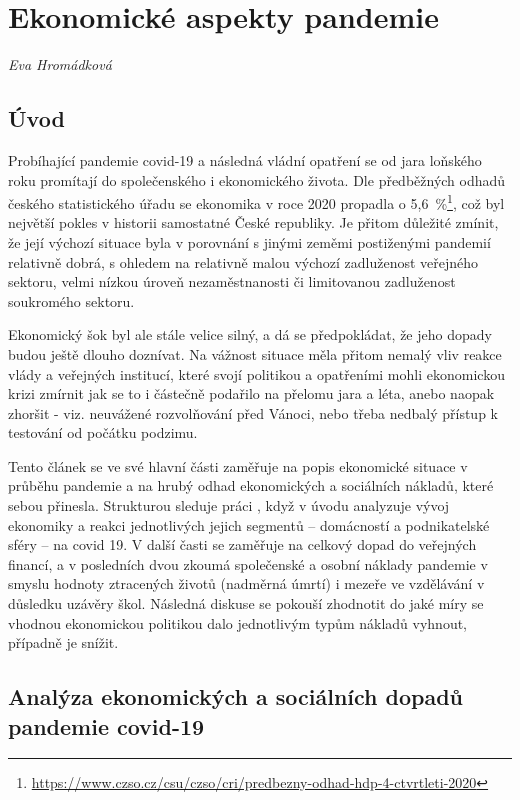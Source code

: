 
\chapter{Ekonomické aspekty pandemie}\label{Ekonomicke_aspekty}

\textit{Eva Hromádková}
\vspace{15mm}

\section*{Úvod} 
Probíhající pandemie covid-19 a následná vládní opatření se od jara loňského roku promítají do společenského i ekonomického života. Dle předběžných odhadů českého statistického úřadu se ekonomika v roce 2020 propadla o 5,6~\%\footnote{\url{https://www.czso.cz/csu/czso/cri/predbezny-odhad-hdp-4-ctvrtleti-2020}}, což byl největší pokles v historii samostatné České republiky. Je přitom důležité zmínit, že její výchozí situace byla v porovnání s jinými zeměmi postiženými pandemií relativně dobrá, s ohledem na relativně malou výchozí zadluženost veřejného sektoru, velmi nízkou úroveň nezaměstnanosti či limitovanou zadluženost soukromého sektoru. 

Ekonomický šok byl ale stále velice silný, a dá se předpokládat, že jeho dopady budou ještě dlouho doznívat. Na vážnost situace měla přitom nemalý vliv reakce vlády a veřejných institucí, které svojí politikou a opatřeními mohli ekonomickou krizi zmírnit jak se to i částečně podařilo na přelomu jara a léta, anebo naopak zhoršit - viz. neuvážené rozvolňování před Vánoci, nebo třeba nedbalý přístup k testování od počátku podzimu.

Tento článek se ve své hlavní části zaměřuje na popis ekonomické situace v průběhu pandemie a na hrubý odhad ekonomických a sociálních nákladů, které sebou přinesla. Strukturou sleduje práci \cite{Levy2021}, když v úvodu analyzuje vývoj ekonomiky a reakci jednotlivých jejich segmentů – domácností a podnikatelské sféry – na covid 19. V další časti se zaměřuje na celkový dopad do veřejných financí, a v posledních dvou zkoumá společenské a osobní náklady pandemie v smyslu hodnoty ztracených životů (nadměrná úmrtí) i mezeře ve vzdělávání v důsledku uzávěry škol. Následná diskuse se pokouší zhodnotit do jaké míry se vhodnou ekonomickou politikou dalo jednotlivým typům nákladů vyhnout, případně je snížit.

\section*{Analýza ekonomických a sociálních dopadů pandemie covid-19} 


